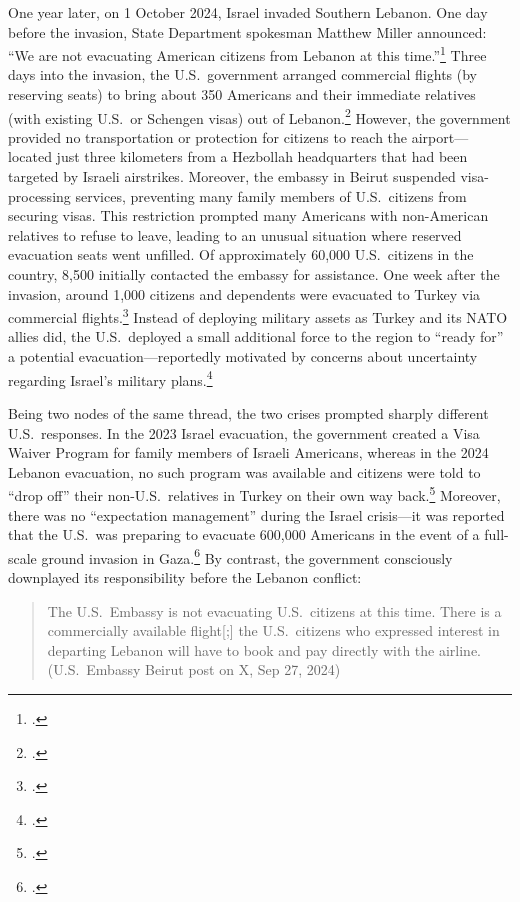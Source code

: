 \documentclass[12pt]{article}
\begin{document}
One year later, on 1 October 2024, Israel invaded Southern Lebanon. One day before the invasion, State Department spokesman Matthew Miller announced: ``We are not evacuating American citizens from Lebanon at this time.''\footnote{\citet{King2024}.} Three days into the invasion, the U.S.\ government arranged commercial flights (by reserving seats) to bring about 350 Americans and their immediate relatives (with existing U.S.\ or Schengen visas) out of Lebanon.\footnote{\citet{Phillips2024}.} However, the government provided no transportation or protection for citizens to reach the airport---located just three kilometers from a Hezbollah headquarters that had been targeted by Israeli airstrikes. Moreover, the embassy in Beirut suspended visa-processing services, preventing many family members of U.S.\ citizens from securing visas. This restriction prompted many Americans with non-American relatives to refuse to leave, leading to an unusual situation where reserved evacuation seats went unfilled. Of approximately 60,000 U.S.\ citizens in the country, 8,500 initially contacted the embassy for assistance. One week after the invasion, around 1,000 citizens and dependents were evacuated to Turkey via commercial flights.\footnote{\citet{Spicer2024}.} Instead of deploying military assets as Turkey and its NATO allies did, the U.S.\ deployed a small additional force to the region to ``ready for'' a potential evacuation---reportedly motivated by concerns about uncertainty regarding Israel's military plans.\footnote{\citet{Lee2024}.}

Being two nodes of the same thread, the two crises prompted sharply different U.S.\ responses. In the 2023 Israel evacuation, the government created a Visa Waiver Program for family members of Israeli Americans, whereas in the 2024 Lebanon evacuation, no such program was available and citizens were told to ``drop off'' their non-U.S.\ relatives in Turkey on their own way back.\footnote{\citet{Phillips2024}.} Moreover, there was no ``expectation management'' during the Israel crisis---it was reported that the U.S.\ was preparing to evacuate 600,000 Americans in the event of a full-scale ground invasion in Gaza.\footnote{\citet{Diver2023}.} By contrast, the government consciously downplayed its responsibility before the Lebanon conflict:

\begin{quote}
The U.S.\ Embassy is not evacuating U.S.\ citizens at this time. There is a commercially available flight[;] the U.S.\ citizens who expressed interest in departing Lebanon will have to book and pay directly with the airline. (U.S.\ Embassy Beirut post on X, Sep 27, 2024)
\end{quote}
\end{document}
